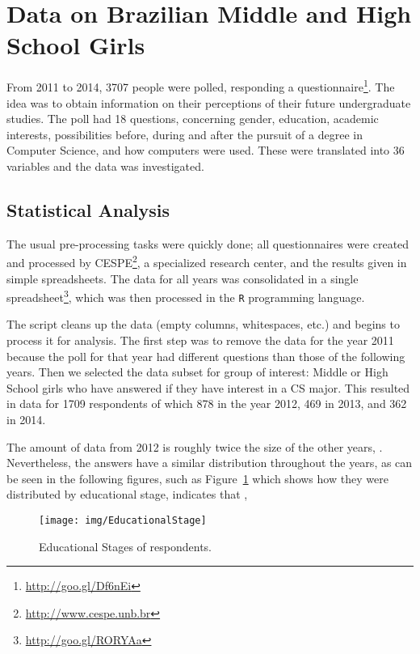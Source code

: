 \section{Data on Brazilian Middle and High School Girls}\label{sec:mining}%

From 2011 to 2014, 3707 people were polled, responding a questionnaire\footnote{\url{http://goo.gl/Df6nEi}}. The idea was to obtain information on their perceptions of their future undergraduate studies. The poll had 18 questions, concerning gender, education, academic interests, possibilities before, during and after the pursuit of a degree in Computer Science, and how computers were used. These were translated into 36 variables and the data was investigated.

\subsection{Statistical Analysis}\label{sec:mining:stat}%
The usual pre-processing tasks were quickly done; all questionnaires were created and processed by CESPE\footnote{\url{http://www.cespe.unb.br}}, a specialized research center, and the results given in simple spreadsheets. The data for all years was consolidated in a single spreadsheet\footnote{\url{http://goo.gl/RORYAa}}, which was then processed in the \texttt{R} programming language.

The script cleans up the data (empty columns, whitespaces, etc.) and begins to process it for analysis. The first step was to remove the data for the year 2011 because the poll for that year had different questions than those of the following years. Then we selected the data subset for group of interest: Middle or High School girls who have answered if they have interest in a CS major. This resulted in data for 1709 respondents of which 878 in the year 2012, 469 in 2013, and 362 in 2014.

The amount of data from 2012 is roughly twice the size of the other years, . Nevertheless, the answers have a similar distribution throughout the years, as can be seen in the following figures, such as Figure~\ref{fig:EducationalStage} which shows how they were distributed by educational stage, indicates that ,

\begin{figure}[h!]%
\texttt{[image: img/EducationalStage]}%
\caption{Educational Stages of respondents.}%
\label{fig:EducationalStage}%
\end{figure}%


